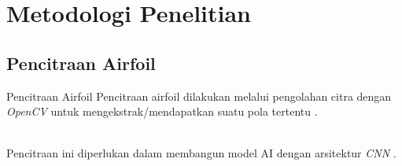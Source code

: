 \section{Metodologi Penelitian}
\subsection{Pencitraan Airfoil}
\begin{frame}{Pencitraan Airfoil}
  Pencitraan airfoil dilakukan melalui pengolahan citra dengan \textit{OpenCV} untuk mengekstrak/mendapatkan suatu pola tertentu \cite{druzhkov2011new}.\\~\\
  \pause

  Pencitraan ini diperlukan dalam membangun model AI dengan arsitektur \textit{CNN} \cite{albawi2017understanding}.\\~\\
\end{frame}

